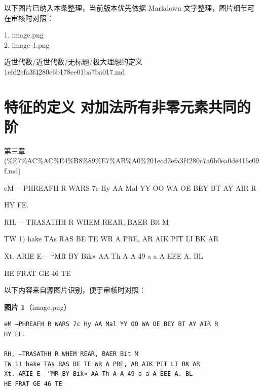 \begin{note}[关联图片]
以下图片已纳入本条整理，当前版本优先依据 Markdown 文字整理，图片细节可在审核时对照：

1. image.png\\
2. image 1.png\\

\end{note}

\begin{note}[来源路径]

近世代数/近世代数/无标题/极大理想的定义 1efd2efa3f4280c6b178ee01ba7ba017.md

\end{note}

\section*{特征的定义 对加法所有非零元素共同的阶}

\begin{note}[来源上级主题]

第三章 (\%E7\%AC\%AC\%E4\%B8\%89\%E7\%AB\%A0\%201ecd2efa3f4280c7a6b0ea0de416c09f.md)

\end{note}

\begin{definition}

eM —PHREAFH R WARS 7c Hy AA Mal YY OO WA OE BEY BT AY AIR R

HY FE.

RH, —TRASATHH R WHEM REAR, BAER Bit M

TW 1) hake TAs RAS BE TE WR A PRE, AR AIK PIT LI BK AR

Xt. ARIE E— “MR BY Bik» AA Th A A 49 a a A EEE A. BL

HE FRAT GE 46 TE

\end{definition}

\begin{note}
以下内容来自源图片识别，便于审核时对照：

\textbf{图片 1}（image.png）
\begin{Verbatim}[fontsize=\small]
eM —PHREAFH R WARS 7c Hy AA Mal YY OO WA OE BEY BT AY AIR R
HY FE.

RH, —TRASATHH R WHEM REAR, BAER Bit M
TW 1) hake TAs RAS BE TE WR A PRE, AR AIK PIT LI BK AR
Xt. ARIE E— “MR BY Bik» AA Th A A 49 a a A EEE A. BL
HE FRAT GE 46 TE
\end{Verbatim}

\end{note}

